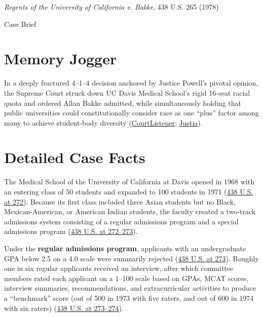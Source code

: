 \documentclass[12pt]{article}
\begin{document}
\begin{center}
{\LARGE \textit{Regents of the University of California v. Bakke}, 438 U.S. 265 (1978)\par}
\vspace{0.8em}
{\large Case Brief\par}
\end{center}
\vspace{1em}

\section{Memory Jogger}
In a deeply fractured 4--1--4 decision anchored by Justice Powell's pivotal opinion, the Supreme Court struck down UC Davis Medical School's rigid 16-seat racial quota and ordered Allan Bakke admitted, while simultaneously holding that public universities could constitutionally consider race as one ``plus'' factor among many to achieve student-body diversity (\href{https://www.courtlistener.com/opinion/109930/regents-of-the-university-of-california-v-bakke/}{CourtListener}; \href{https://supreme.justia.com/cases/federal/us/438/265/}{Justia}).

\section{Detailed Case Facts}
The Medical School of the University of California at Davis opened in 1968 with an entering class of 50 students and expanded to 100 students in 1971 (\href{https://supreme.justia.com/cases/federal/us/438/265/}{438 U.S. at 272}). Because its first class included three Asian students but no Black, Mexican-American, or American Indian students, the faculty created a two-track admissions system consisting of a regular admissions program and a special admissions program (\href{https://supreme.justia.com/cases/federal/us/438/265/}{438 U.S. at 272--273}).

Under the \textbf{regular admissions program}, applicants with an undergraduate GPA below 2.5 on a 4.0 scale were summarily rejected (\href{https://supreme.justia.com/cases/federal/us/438/265/}{438 U.S. at 273}). Roughly one in six regular applicants received an interview, after which committee members rated each applicant on a 1--100 scale based on GPAs, MCAT scores, interview summaries, recommendations, and extracurricular activities to produce a ``benchmark'' score (out of 500 in 1973 with five raters, and out of 600 in 1974 with six raters) (\href{https://supreme.justia.com/cases/federal/us/438/265/}{438 U.S. at 273--274}).
\end{document}
